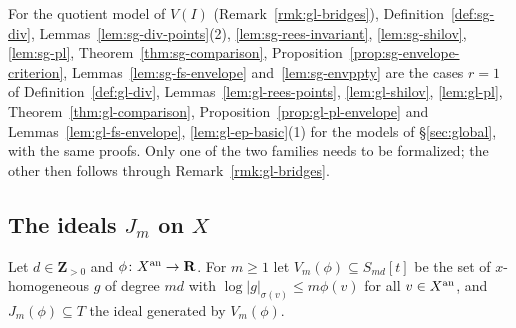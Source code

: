 \begin{remark}\label{rmk:sg-general-models}
For the quotient model of $V(I)$ (Remark~\ref{rmk:gl-bridges}), Definition~\ref{def:sg-div}, Lemmas~\ref{lem:sg-div-points}(2),
\ref{lem:sg-rees-invariant}, \ref{lem:sg-shilov}, \ref{lem:sg-pl}, Theorem~\ref{thm:sg-comparison}, Proposition~\ref{prop:sg-envelope-criterion},
Lemmas~\ref{lem:sg-fs-envelope} and~\ref{lem:sg-envppty} are the cases $r=1$ of Definition~\ref{def:gl-div}, Lemmas~\ref{lem:gl-rees-points},
\ref{lem:gl-shilov}, \ref{lem:gl-pl}, Theorem~\ref{thm:gl-comparison}, Proposition~\ref{prop:gl-pl-envelope} and Lemmas~\ref{lem:gl-fs-envelope},
\ref{lem:gl-ep-basic}(1) for the models of \S\ref{sec:global}, with the same proofs. Only one of the two families needs to be formalized; the
other then follows through Remark~\ref{rmk:gl-bridges}.
\end{remark}

\subsection{The ideals \texorpdfstring{$J_m$}{Jm} on \texorpdfstring{$X$}{X}}\label{subsec:sg-Jm}

\begin{definition}\label{def:sg-Jm}
\leanok
{}
Let $d\in\mathbf{Z}_{>0}$ and $\phi\colon X^{\mathrm{an}}\to\mathbf{R}$. For $m\ge1$ let $V_m(\phi)\subseteq S_{md}[t]$ be the set of $x$-homogeneous $g$ of degree
$md$ with $\log|g|_{\sigma(v)}\le m\phi(v)$ for all $v\in X^{\mathrm{an}}$, and $J_m(\phi)\subseteq T$ the ideal generated by $V_m(\phi)$.
\end{definition}

